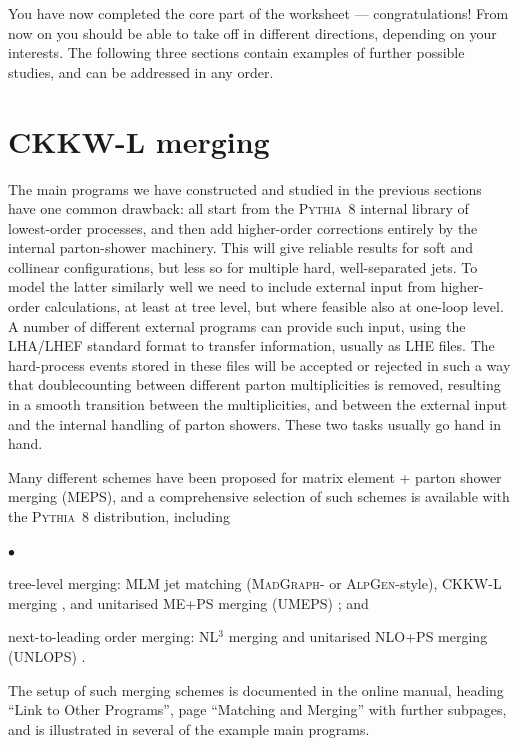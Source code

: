 \documentclass[12pt,a4paper]{article}
\newenvironment{Itemize}{\begin{list}{$\bullet$}%
{\setlength{\topsep}{0.4mm}\setlength{\partopsep}{0.4mm}%
\setlength{\itemsep}{0.4mm}\setlength{\parsep}{0.4mm}}}%
{\end{list}}
\begin{document}
You have now completed the core part of the worksheet --- congratulations! 
From now on you should be able to take off in different directions, 
depending on your interests. The following three sections contain 
examples of further possible studies, and can be addressed in any order.  

\section{CKKW-L merging}

The main programs we have constructed and studied in the previous sections 
have one common drawback: all start from the \textsc{Pythia}~8 internal
library of lowest-order processes, and then add higher-order corrections
entirely by the internal parton-shower machinery. This will give
reliable results for soft and collinear configurations, but less so for 
multiple hard, well-separated jets. To model the latter similarly well 
we need to include external input from higher-order calculations, 
at least at tree level, but where feasible also at one-loop level. 
A number of different external programs can provide such input, using 
the LHA/LHEF standard format \cite{leshouchesaccord,leshoucheseventfiles} 
to transfer information, usually as LHE files. The hard-process events 
stored in these files will be accepted or rejected in such a way that 
doublecounting between different parton multiplicities is removed, 
resulting in a smooth transition between the multiplicities, and 
between the external input and the internal handling of parton showers. 
These two tasks usually go hand in hand.

Many different schemes have been proposed for matrix element + parton 
shower merging (MEPS), and a comprehensive selection of such schemes 
is available with the \textsc{Pythia}~8 distribution, including
\begin{Itemize}
\item tree-level merging: {\smaller MLM} jet matching \cite{mlm} 
(\textsc{MadGraph}- 
or \textsc{AlpGen}-style), {\smaller CKKW-L} merging \cite{ckkwl}, and 
unitarised {\smaller ME}+{\smaller PS} merging ({\smaller UMEPS})
\cite{umeps}; and
\item next-to-leading order merging: \textsc{NL$^3$} merging and
unitarised NLO+PS merging \mbox{({\smaller UNLOPS})} \cite{unlops}.
\end{Itemize}
The setup of such merging schemes is documented in the online manual,
heading ``Link to Other Programs'', page ``Matching and Merging'' with
further subpages, and is illustrated in several of the example main 
programs.
\end{document}
